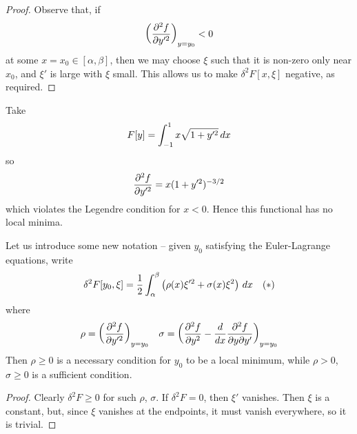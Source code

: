 \documentclass{../template/note}
\begin{document}
    \begin{proof}
        Observe that, if
        \begin{align*}
            \left(\pd{^2f}{y'^2}\right)_{y=y_0} < 0
        \end{align*}
        at some $x = x_0 \in [\alpha, \beta]$, then we may choose $\xi$ such that it is non-zero only near $x_0$, and $\xi'$ is large with $\xi$ small. This allows us to make $\delta^2 F[x, \xi]$ negative, as required.        
    \end{proof}
    
    \begin{example*}
        Take
        \begin{align*}
            F[y] = \int_{-1}^1 x\sqrt{1+y'^2} \,d{x}
        \end{align*}
        so
        \begin{align*}
            \pd{^2f}{y'^2} = x(1+y'^2)^{-3/2}
        \end{align*}
        which violates the Legendre condition for $x < 0$. Hence this functional has no local minima.       
    \end{example*}
    
    Let us introduce some new notation -- given $y_0$ satisfying the Euler-Lagrange equations, write
    \begin{align*}
        \delta^2 F[y_0, \xi] = \frac 1 2 \int_\alpha^\beta \left(\rho(x) \xi'^2 + \sigma(x) \xi^2\right) \,d{x} && (*)
    \end{align*}
    where
    \begin{align*}
        \rho = \left(\pd{^2f}{y'^2}\right)_{y=y_0} && \sigma = \left(\pd{^2f}{y^2} - \frac{d}{dx} \pd{^2f}{y\pr y'}\right)_{y=y_0}
    \end{align*}
    Then $\rho \geq 0$ is a necessary condition for $y_0$ to be a local minimum, while $\rho > 0$, $\sigma \geq 0$ is a sufficient condition.

    \begin{proof}
        Clearly $\delta^2 F \geq 0$ for such $\rho$, $\sigma$. If $\delta^2 F = 0$, then $\xi'$ vanishes. Then $\xi$ is a constant, but, since $\xi$ vanishes at the endpoints, it must vanish everywhere, so it is trivial.
    \end{proof}
    
\end{document}
